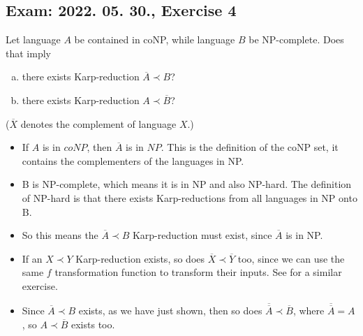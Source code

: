 \subsection{Exam: 2022. 05. 30., Exercise 4}


Let language $A$ be contained in coNP, while language $B$ be NP-complete.
Does that imply

\begin{enumerate}[a)]
    \item there exists Karp-reduction $\overline{A} \prec B$?
    \item there exists Karp-reduction $A \prec \overline{B}$?
\end{enumerate}

($\overline{X}$ denotes the complement of language $X$.)


\begin{itemize}
    \item If $A$ is in $coNP$, then $\overline{A}$ is in $NP$. This is the definition of the coNP set, it contains the complementers of the languages in NP.
    \item B is NP-complete, which means it is in NP and also NP-hard. The definition of NP-hard is that there exists Karp-reductions from all languages in NP onto B.
    \item So this means the $\overline{A} \prec B$ Karp-reduction must exist, since $\overline{A}$ is in NP.
    \item If an $X\prec{}Y$ Karp-reduction exists, so does $\overline{X}\prec{}\overline{Y}$ too, since we can use the same $f$ transformation function to transform their inputs. See  for a similar exercise.
    \item Since $\overline{A} \prec B$ exists, as we have just shown, then so does $\overline{\overline{A}} \prec \overline{B}$, where $\overline{\overline{A}} = A$, so $A\prec{}\overline{B}$ exists too.
\end{itemize}
